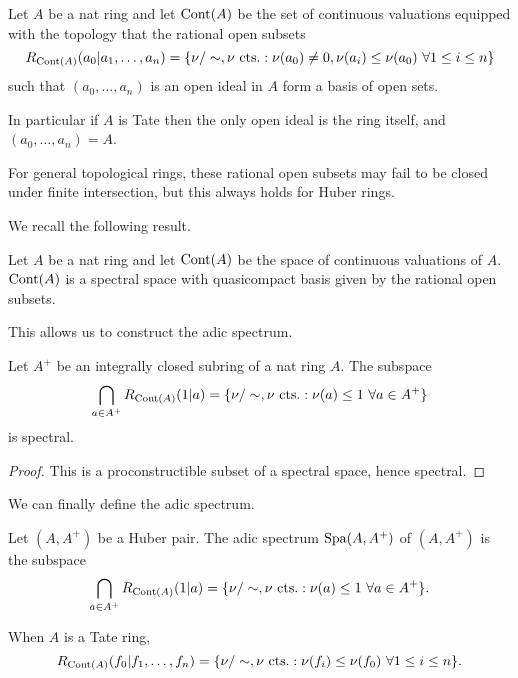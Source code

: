 \begin{definition}\label{def: space of continuous valuations}
    Let $A$ be a nat ring and let $\mathrm{Cont}(A)$ be the set of continuous valuations equipped with the topology that the rational open subsets 
    $$R_{\mathrm{Cont}(A)}(a_{0}|a_{1},\dots,a_{n})=\left\{\nu/\sim,\nu\text{ cts.}:\nu(a_{0})\neq0,\nu(a_{i})\leq\nu(a_{0})\text{ }\forall 1\leq i\leq n\right\}$$
    such that $(a_{0},\dots,a_{n})$ is an open ideal in $A$ form a basis of open sets. 
\end{definition}
\begin{remark}
    In particular if $A$ is Tate then the only open ideal is the ring itself, and $(a_{0},\dots,a_{n})=A$. 
\end{remark}
\begin{remark}
    For general topological rings, these rational open subsets may fail to be closed under finite intersection, but this always holds for Huber rings. 
\end{remark}
We recall the following result. 
\begin{proposition}\label{prop: cont is spectral}
    Let $A$ be a nat ring and let $\mathrm{Cont}(A)$ be the space of continuous valuations of $A$. $\mathrm{Cont}(A)$ is a spectral space with quasicompact basis given by the rational open subsets. 
\end{proposition}
This allows us to construct the adic spectrum. 
\begin{corollary}\label{corr: adic spectrum is spectral}
    Let $A^{+}$ be an integrally closed subring of a nat ring $A$. The subspace
    $$\bigcap_{a\in A^{+}}R_{\mathrm{Cont}(A)}(1|a)=\{\nu/\sim,\nu\text{ cts.}:\nu(a)\leq 1\text{ }\forall a\in A^{+}\}$$
    is spectral.
\end{corollary}
\begin{proof}
    This is a proconstructible subset of a spectral space, hence spectral. 
\end{proof}
We can finally define the adic spectrum. 
\begin{definition}\label{def: affinoid adic space}
    Let $(A,A^{+})$ be a Huber pair. The adic spectrum $\mathrm{Spa}(A,A^{+})$ of $(A,A^{+})$ is the subspace 
    $$\bigcap_{a\in A^{+}}R_{\mathrm{Cont}(A)}(1|a)=\{\nu/\sim,\nu\text{ cts.}:\nu(a)\leq 1\text{ }\forall a\in A^{+}\}.$$
\end{definition}
\begin{remark}
    When $A$ is a Tate ring, 
    $$R_{\mathrm{Cont}(A)}(f_{0}|f_{1},\dots,f_{n})=\{\nu/\sim,\nu\text{ cts.}:\nu(f_{i})\leq\nu(f_{0})\text{ }\forall 1\leq i\leq n\}.$$
\end{remark}
